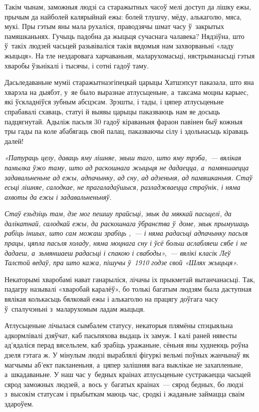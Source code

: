 Такім чынам, заможныя людзі са старажытных часоў мелі доступ да лішку ежы, прычым да найболей калярыйнай ежы: болей тлушчу, мёду, алькаголю, мяса, мукі. Пры гэтым яны мала рухаліся, праводзячы шмат часу ў~закрытых памяшканьнях. Гучыць падобна да жыцьця сучаснага чалавека? Нядзіўна, што ў~такіх людзей часьцей разьвіваліся такія вядомыя нам захворваньні «ладу жыцьця». На тле нездаровага харчаваньня, маларухомасьці, нястрыманасьці гэтыя хваробы ўзьнікалі і тысячы, і сотні гадоў таму.

Дасьледаваньне муміі старажытнаэгіпецкай царыцы Хатшэпсут паказала, што яна хварэла на дыябэт, у~яе было выразнае атлусьценьне, а~таксама моцны карыес, які ўскладніўся зубным абсцэсам. Зрэшты, і тады, і цяпер атлусьценьне спрабавалі схаваць, статуі й выявы царыцы паказваюць нам яе досыць падцягнутай. Адыліж пасьля 30 гадоў кіраваньня фараон павінен быў кожныя тры гады па коле абабягаць свой палац, паказваючы сілу і здольнасьць кіраваць далей!

\emph{«Патураць целу, даваць яму лішняе, звыш таго, што яму трэба,~--- вялікая памылка ўжо таму, што ад раскошнага жыцьця не дадаецца, а~памяншаецца задавальненьне ад ежы, адпачынку, ад сну, ад адзеньня, ад памяшканьня. Стаў есьці лішняе, салодкае, не прагаладаўшыся, разладжваецца страўнік, і няма ахвоты да ежы і задавальненьняў.}

\emph{Стаў езьдзіць там, дзе мог пешшу прайсьці, звык да мяккай пасьцелі, да далікатнай, салодкай ежы, да раскошнага ўбранства ў~доме, звык прымушаць рабіць іншых, што сам можаш зрабіць ,~--- і няма радасьці адпачынку пасьля працы, цяпла пасьля холаду, няма моцнага сну і ўсё больш аслабляеш сябе і не дадаеш, а~зьмяншаеш радасьці і спакою і свабоды»,~--- вялікі класік Леў Талстой ведаў, пра што кажа, пішучы ў~1910 годзе свой «Шлях жыцьця».}


Некаторымі хваробамі нават ганарыліся, лічачы іх прыкметай вытанчанасьці. Так, падагру называлі «хваробай каралёў», бо толькі багатым людзям была даступная вялікая колькасьць бялковай ежы і алькаголю на працягу доўгага часу ў~спалучэньні з~маларухомым ладам жыцьця.

Атлусьценьне лічылася сымбалем статусу, некаторыя плямёны спэцыяльна адкормлівалі дзяўчат, каб пасьпяхова выдаць іх замуж. І калі раней нявесты ад'ядаліся перад вясельлем, каб зрабіць уражаньне, сёньня яны худнеюць роўна дзеля гэтага ж. У мінулым людзі выраблялі фігуркі вельмі поўных жанчынаў як магчымы аб'ект пакланеньня, а~цяпер залішняя вага выклікае не захапленьне, а~шкадаваньне. У наш час у~бедных краінах атлусьценьне сустракаецца часьцей сярод заможных людзей, а~вось у~багатых краінах~--- сярод бедных, бо людзі з~высокім статусам і прыбыткам маюць час, сродкі і жаданьне займацца сваім здароўем.

